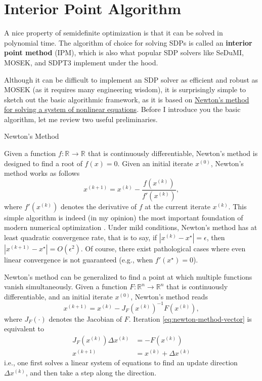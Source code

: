 \documentclass[
]{book}
\theoremstyle{definition}
\theoremstyle{definition}
\theoremstyle{definition}
\theoremstyle{definition}
\theoremstyle{remark}
\begin{document}
\section{Interior Point Algorithm}\label{interior-point-algorithm}

A nice property of semidefinite optimization is that it can be solved in polynomial time. The algorithm of choice for solving SDPs is called an \textbf{interior point method} (IPM), which is also what popular SDP solvers like SeDuMI, MOSEK, and SDPT3 implement under the hood.

Although it can be difficult to implement an SDP solver as efficient and robust as MOSEK (as it requires many engineering wisdom), it is surprisingly simple to sketch out the basic algorithmic framework, as it is based on \href{https://en.wikipedia.org/wiki/Newton\%27s_method\#:~:text=14\%20External\%20links-,Description,the\%20method\%20can\%20be\%20iterated.}{Newton's method for solving a system of nonlinear equations}. Before I introduce you the basic algorithm, let me review two useful preliminaries.

Newton's Method

Given a function \(f: \mathbb{R}^{} \rightarrow \mathbb{R}^{}\) that is continuously differentiable, Newton's method is designed to find a root of \(f(x) = 0\). Given an initial iterate \(x^{(0)}\), Newton's method works as follows
\[
x^{(k+1)} = x^{(k)} - \frac{f(x^{(k)})}{f'(x^{(k)})},
\]
where \(f'(x^{(k)})\) denotes the derivative of \(f\) at the current iterate \(x^{(k)}\). This simple algorithm is indeed (in my opinion) the most important foundation of modern numerical optimization \citep{nocedal99book-numerical}. Under mild conditions, Newton's method has at least quadratic convergence rate, that is to say, if \(|x^{(k)} - x^\star| = \epsilon\), then \(|x^{(k+1)} - x^\star| = O(\epsilon^2)\). Of course, there exist pathological cases where even linear convergence is not guaranteed (e.g., when \(f'(x^\star) = 0\)).

Newton's method can be generalized to find a point at which multiple functions vanish simultaneously. Given a function \(F: \mathbb{R}^{n} \rightarrow \mathbb{R}^{n}\) that is continuously differentiable, and an initial iterate \(x^{(0)}\), Newton's method reads
\begin{equation}
x^{(k+1)} = x^{(k)} - J_F(x^{(k)})^{-1}F(x^{(k)}),
\label{eq:newton-method-vector}
\end{equation}
where \(J_F(\cdot)\) denotes the Jacobian of \(F\). Iteration \eqref{eq:newton-method-vector} is equivalent to
\begin{equation}
\begin{split}
J_F(x^{(k)}) \Delta x^{(k)} & = - F(x^{(k)}) \\
x^{(k+1)} & = x^{(k)} + \Delta x^{(k)}
\end{split}
\label{eq:newton-method-vector-1}
\end{equation}
i.e., one first solves a linear system of equations to find an update direction \(\Delta x^{(k)}\), and then take a step along the direction.
\end{document}
